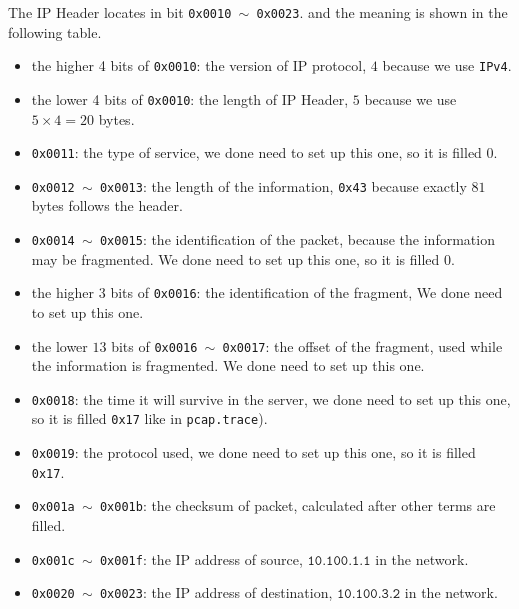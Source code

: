 \documentclass[11pt]{article}
\begin{document}
	\par The IP Header locates in bit \texttt{0x0010 $\sim$ 0x0023}. and the meaning is shown in the following table.
	
	\begin{itemize}
		\item the higher 4 bits of \texttt{0x0010}: the version of IP protocol, $4$ because we use \texttt{IPv4}.
		
		\item the lower 4 bits of \texttt{0x0010}: the length of IP Header, $5$ because we use $5 \times 4 = 20$ bytes.
		
		\item \texttt{0x0011}: the type of service, we done need to set up this one, so it is filled $0$.
		
		\item \texttt{0x0012 $\sim$ 0x0013}: the length of the information, \texttt{0x43} because exactly $81$ bytes follows the header.
		
		\item \texttt{0x0014 $\sim$ 0x0015}: the identification of the packet, because the information may be fragmented. We done need to set up this one, so it is filled $0$.
		
		\item the higher $3$ bits of \texttt{0x0016}: the identification of the fragment, We done need to set up this one.
		
		\item the lower $13$ bits of \texttt{0x0016 $\sim$ 0x0017}: the offset of the fragment, used while the information is fragmented. We done need to set up this one.
		
		\item \texttt{0x0018}: the time it will survive in the server, we done need to set up this one, so it is filled \texttt{0x17} like in \texttt{pcap.trace}).
		
		\item \texttt{0x0019}: the protocol used, we done need to set up this one, so it is filled \texttt{0x17}.
		
		\item \texttt{0x001a $\sim$ 0x001b}: the checksum of packet, calculated after other terms are filled.
		
		\item \texttt{0x001c $\sim$ 0x001f}: the IP address of source, $\texttt{10.100.1.1}$ in the network.
		
		\item \texttt{0x0020 $\sim$ 0x0023}: the IP address of destination, $\texttt{10.100.3.2}$ in the network.
		
	\end{itemize}
	
\end{document}
